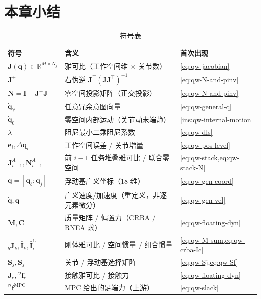 \section*{本章小结}

\begin{table}[H]\centering\small
\caption{符号表}
\begin{tabular}{lll}
\toprule
符号 & 含义 & 首次出现 \\
\midrule
$\boldsymbol{J}(\boldsymbol{q})\in\mathbb{R}^{M\times N_j}$ & 雅可比（工作空间维 $\times$ 关节数）& \cref{eq:qw-jacobian} \\
$\boldsymbol{J}^+$ & 右伪逆 $\boldsymbol{J}^\top(\boldsymbol{J}\boldsymbol{J}^\top)^{-1}$ & \cref{eq:qw-N-and-pinv} \\
$\boldsymbol{N}=\mathbf{I}-\boldsymbol{J}^+\boldsymbol{J}$ & 零空间投影矩阵（正交投影）& \cref{eq:qw-N-and-pinv} \\
$\dot{\boldsymbol{q}}_{\forall}$ & 任意冗余意图向量 & \cref{eq:qw-general-q} \\
$\dot{\boldsymbol{q}}_0$ & 零空间内部运动（关节动末端静）& \cref{ins:qw-internal-motion} \\
$\lambda$ & 阻尼最小二乘阻尼系数 & \cref{eq:qw-dls} \\
$\boldsymbol{e}_i,\Delta\boldsymbol{q}_i$ & 工作空间误差 / 关节增量 & \cref{eq:qw-pos-level} \\
$\boldsymbol{J}_{i-1}^A,\boldsymbol{N}_{i-1}^A$ & 前 $i{-}1$ 任务堆叠雅可比 / 联合零空间 & \cref{eq:qw-stack,eq:qw-stack-N} \\
$\boldsymbol{q}=[\boldsymbol{q}_b;\boldsymbol{q}_j]$ & 浮动基广义坐标（$18$ 维）& \cref{eq:qw-gen-coord} \\
$\dot{\boldsymbol{q}},\ddot{\boldsymbol{q}}$ & 广义速度/加速度（重定义，非逐元素微分）& \cref{eq:qw-gen-vel} \\
$\boldsymbol{M},\boldsymbol{C}$ & 质量矩阵 / 偏置力（CRBA / RNEA 求）& \cref{eq:qw-floating-dyn} \\
${}_{b}\boldsymbol{J}_k,\hat{\mathbf{I}}_k,\hat{\mathbf{I}}_i^{C}$ & 刚体雅可比 / 空间惯量 / 组合惯量 & \cref{eq:qw-M-sum,eq:qw-crba-Ic} \\
$\boldsymbol{S}_j,\boldsymbol{S}_f$ & 关节 / 浮动基选择矩阵 & \cref{eq:qw-Sj,eq:qw-Sf} \\
$\boldsymbol{J}_c,{}^{\mathcal{O}}\boldsymbol{f}_c$ & 接触雅可比 / 接触力 & \cref{eq:qw-floating-dyn} \\
${}^{\mathcal{O}}\boldsymbol{f}^{\mathrm{MPC}}$ & MPC 给出的足端力（上游）& \cref{eq:qw-slack} \\

\end{tabular}
\end{table}
